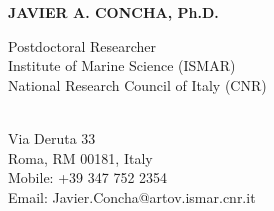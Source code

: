 \documentclass[11pt]{res} %
\begin{document}
 
{\centering \Large \bf JAVIER A. CONCHA, Ph.D.\par} %
\vspace{0.3in}                                         
\begin{multicols}{2}
{\raggedright Postdoctoral Researcher\\Institute of Marine Science (ISMAR)\\ National Research Council of Italy (CNR)\\ ~~~~~~~~~~~~~~~~~~~~~~~~~~~~~~~~~~~\\}
{\raggedleft Via Deruta 33\\Roma, RM 00181, Italy\\Mobile: +39 347 752 2354\\Email: Javier.Concha@artov.ismar.cnr.it\\}
\end{multicols}
\vspace{-0.4in} 
\hrulefill
\end{document}
